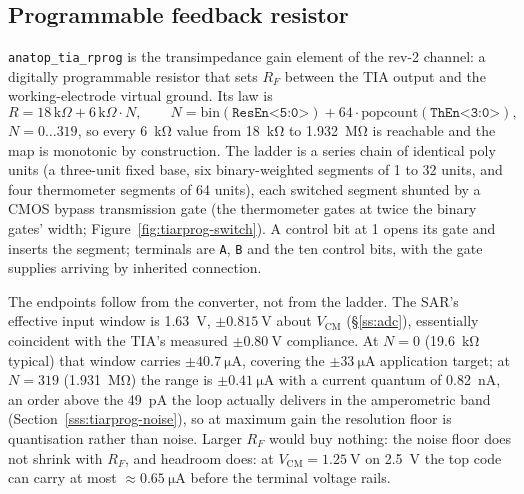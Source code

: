%
%
%

\subsection{Programmable feedback resistor}\label{ss:tiarprog}

\texttt{anatop\_tia\_rprog} is the transimpedance gain element of the rev-2 channel:
a digitally programmable resistor that sets \(R_F\) between the TIA output and the
working-electrode virtual ground. Its law is
\[
R = 18\,\mathrm{k}\Omega + 6\,\mathrm{k}\Omega\cdot N,\qquad
N = \mathrm{bin}(\texttt{ResEn<5:0>}) + 64\cdot\mathrm{popcount}(\texttt{ThEn<3:0>}),
\]
\(N = 0\ldots 319\), so every \SI{6}{\kilo\ohm} value from \SI{18}{\kilo\ohm} to
\SI{1.932}{\mega\ohm} is reachable and the map is monotonic by construction. The
ladder is a series chain of identical poly units (a three-unit fixed base, six
binary-weighted segments of 1 to 32 units, and four thermometer segments of 64
units), each switched segment shunted by a CMOS bypass transmission gate
(the thermometer gates at twice the binary gates' width;
Figure~\ref{fig:tiarprog-switch}). A control bit at 1
opens its gate and inserts the segment; terminals are \texttt{A}, \texttt{B} and
the ten control bits, with the gate supplies arriving by inherited connection.

The endpoints follow from the converter, not from the ladder. The SAR's effective
input window is \SI{1.63}{\volt}, \(\pm\SI{0.815}{\volt}\) about
\(V_{\mathrm{CM}}\) (\S\ref{ss:adc}), essentially coincident with the TIA's
measured \(\pm\SI{0.80}{\volt}\) compliance. At \(N=0\)
(\SI{19.6}{\kilo\ohm} typical) that window carries \(\pm\SI{40.7}{\micro\ampere}\),
covering the \(\pm\SI{33}{\micro\ampere}\) application target; at \(N=319\)
(\SI{1.931}{\mega\ohm}) the range is \(\pm\SI{0.41}{\micro\ampere}\) with a
current quantum of \SI{0.82}{\nano\ampere}, an order above the
\SI{49}{\pico\ampere} the loop actually delivers in the amperometric band
(Section~\ref{sss:tiarprog-noise}), so at maximum gain the resolution floor is
quantisation rather than noise. Larger \(R_F\) would buy nothing: the noise
floor does not shrink with \(R_F\), and headroom does: at
\(V_{\mathrm{CM}}=\SI{1.25}{\volt}\) on \SI{2.5}{\volt} the top code can carry at
most \(\approx\SI{0.65}{\micro\ampere}\) before the terminal voltage rails.

